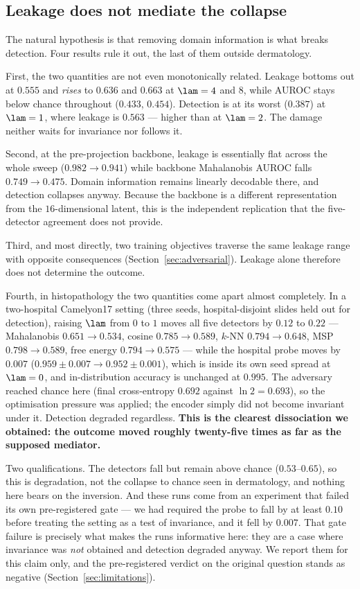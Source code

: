 \subsection{Leakage does not mediate the collapse}
\label{sec:nonmediation}

The natural hypothesis is that removing domain information is what breaks detection.
Four results rule it out, the last of them outside dermatology.

First, the two quantities are not even monotonically related. Leakage bottoms out at
$0.555$ and \emph{rises} to $0.636$ and $0.663$ at $\lam = 4$ and $8$, while AUROC
stays below chance throughout ($0.433$, $0.454$). Detection is at its worst
($0.387$) at $\lam = 1$, where leakage is $0.563$ --- higher than at $\lam = 2$. The
damage neither waits for invariance nor follows it.

Second, at the pre-projection backbone, leakage is essentially flat across the whole
sweep ($0.982 \to 0.941$) while backbone Mahalanobis AUROC falls $0.749 \to 0.475$.
Domain information remains linearly decodable there, and detection collapses anyway.
Because the backbone is a different representation from the $16$-dimensional latent,
this is the independent replication that the five-detector agreement does not provide.

Third, and most directly, two training objectives traverse the same leakage range with
opposite consequences (Section~\ref{sec:adversarial}). Leakage alone therefore does not
determine the outcome.

Fourth, in histopathology the two quantities come apart almost completely. In a
two-hospital Camelyon17 setting (three seeds, hospital-disjoint slides held out
for detection), raising $\lam$ from $0$ to $1$ moves all five detectors by
$0.12$ to $0.22$ --- Mahalanobis $0.651 \to 0.534$, cosine $0.785 \to 0.589$,
$k$-NN $0.794 \to 0.648$, MSP $0.798 \to 0.589$, free energy
$0.794 \to 0.575$ --- while the hospital probe moves by $0.007$
($0.959 \pm 0.007 \to 0.952 \pm 0.001$), which is inside its own seed spread at
$\lam = 0$, and in-distribution accuracy is unchanged at $0.995$. The adversary
reached chance here (final cross-entropy $0.692$ against $\ln 2 = 0.693$), so
the optimisation pressure was applied; the encoder simply did not become
invariant under it. Detection degraded regardless. \textbf{This is the clearest
dissociation we obtained: the outcome moved roughly twenty-five times as far as
the supposed mediator.}

Two qualifications. The detectors fall but remain above chance ($0.53$--$0.65$),
so this is degradation, not the collapse to chance seen in dermatology, and
nothing here bears on the inversion. And these runs come from an experiment that
failed its own pre-registered gate --- we had required the probe to fall by at
least $0.10$ before treating the setting as a test of invariance, and it fell by
$0.007$. That gate failure is precisely what makes the runs informative here:
they are a case where invariance was \emph{not} obtained and detection degraded
anyway. We report them for this claim only, and the pre-registered verdict on
the original question stands as negative (Section~\ref{sec:limitations}).


